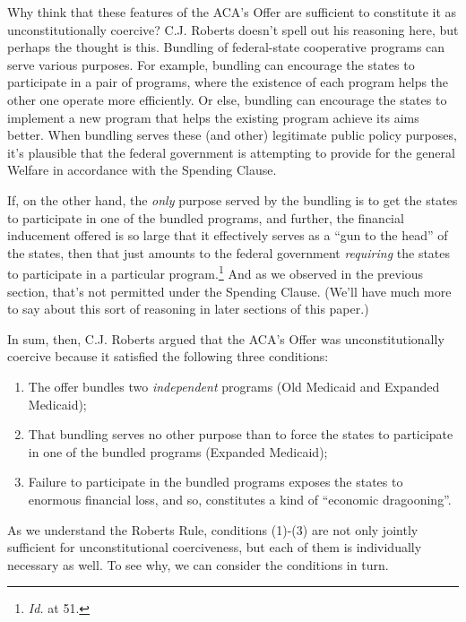 \documentclass[
  11pt,
  letterpaper,
  DIV=11,
  numbers=noendperiod,
  twoside]{scrartcl}
\providecommand{\tightlist}{%
  \setlength{\itemsep}{0pt}\setlength{\parskip}{0pt}}
\begin{document}
Why think that these features of the ACA's Offer are sufficient to
constitute it as unconstitutionally coercive? C.J. Roberts doesn't spell
out his reasoning here, but perhaps the thought is this. Bundling of
federal-state cooperative programs can serve various purposes. For
example, bundling can encourage the states to participate in a pair of
programs, where the existence of each program helps the other one
operate more efficiently. Or else, bundling can encourage the states to
implement a new program that helps the existing program achieve its aims
better. When bundling serves these (and other) legitimate public policy
purposes, it's plausible that the federal government is attempting to
provide for the general Welfare in accordance with the Spending Clause.

If, on the other hand, the \emph{only} purpose served by the bundling is
to get the states to participate in one of the bundled programs, and
further, the financial inducement offered is so large that it
effectively serves as a ``gun to the head'' of the states, then that
just amounts to the federal government \emph{requiring} the states to
participate in a particular program.\footnote{\emph{Id.} at 51.} And as
we observed in the previous section, that's not permitted under the
Spending Clause. (We'll have much more to say about this sort of
reasoning in later sections of this paper.)

In sum, then, C.J. Roberts argued that the ACA's Offer was
unconstitutionally coercive because it satisfied the following three
conditions:

\begin{enumerate}
\def\labelenumi{\arabic{enumi}.}
\tightlist
\item
  The offer bundles two \emph{independent} programs (Old Medicaid and
  Expanded Medicaid);
\item
  That bundling serves no other purpose than to force the states to
  participate in one of the bundled programs (Expanded Medicaid);
\item
  Failure to participate in the bundled programs exposes the states to
  enormous financial loss, and so, constitutes a kind of ``economic
  dragooning''.
\end{enumerate}

As we understand the Roberts Rule, conditions (1)-(3) are not only
jointly sufficient for unconstitutional coerciveness, but each of them
is individually necessary as well. To see why, we can consider the
conditions in turn.
\end{document}

